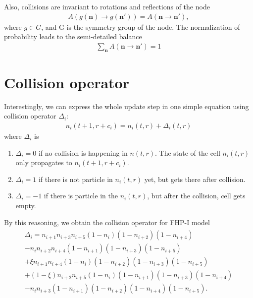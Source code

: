 Also, collisions are invariant to rotations and reflections of the node
\begin{align*}
A(g(\bm{n}) \rightarrow g(\bm{n'})) = A(\bm{n} \rightarrow \bm{n'}),
\end{align*}
where $g \in G$, and G is the symmetry group of the node.
The normalization of probability leads to the semi-detailed balance
\begin{align} \label{smd}
\sum_{\bm{n}} A(\bm{n} \rightarrow \bm{n'}) = 1	
\end{align}

\section{Collision operator}
Interestingly, we can express the whole update step in one simple equation using collision operator $\Delta_i$:
\begin{align} \label{withcol}
n_i(t+1,r+c_i) = n_i(t,r) + \Delta_i(t,r)
\end{align}
where $\Delta_i$ is
\begin{enumerate}
\item $\Delta_i = 0$ if no collision is happening in $n(t,r)$. The state of the cell $n_i(t,r)$ only propagates to $n_i(t+1,r+c_i)$.
\item $\Delta_i = 1$ if there is not particle in $n_i(t,r)$ yet, but gets there after collision. 
\item $\Delta_i = -1$ if there is particle in the $n_i(t,r)$, but after the collision, cell gets empty.
\end{enumerate}

\bigskip


By this reasoning, we obtain the collision operator for FHP-I model
\begin{align} \label{colop}
\begin{split}
\Delta_i = n_{i+1}n_{i+3}n_{i+5}(1-n_i)(1-n_{i+2})(1-n_{i+4})\\
-n_in_{i+2}n_{i+4}(1-n_{i+1})(1-n_{i+3})(1-n_{i+5})\\
 + \xi n_{i+1}n_{i+4}(1-n_i)(1-n_{i+2})(1-n_{i+3})(1-n_{i+5})\\
 +(1-\xi)n_{i+2}n_{i+5}(1-n_i)(1-n_{i+1})(1-n_{i+3})(1-n_{i+4})\\
 -n_in_{i+3}(1-n_{i+1})(1-n_{i+2})(1-n_{i+4})(1-n_{i+5}).
\end{split}
\end{align}

